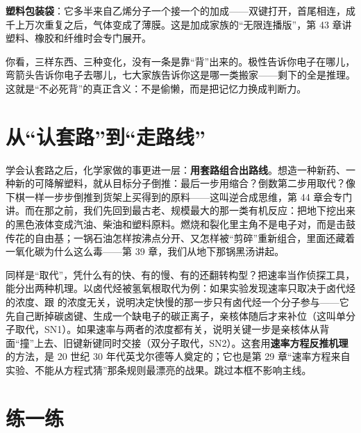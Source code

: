 \textbf{塑料包装袋}：它多半来自乙烯分子一个接一个的加成——双键打开，首尾相连，成千上万次重复之后，气体变成了薄膜。这是加成家族的“无限连播版”，第 43 章讲塑料、橡胶和纤维时会专门展开。

你看，三样东西、三种变化，没有一条是靠“背”出来的。极性告诉你电子在哪儿，弯箭头告诉你电子去哪儿，七大家族告诉你这是哪一类搬家——剩下的全是推理。这就是“不必死背”的真正含义：不是偷懒，而是把记忆力换成判断力。

\section{从“认套路”到“走路线”}

学会认套路之后，化学家做的事更进一层：\textbf{用套路组合出路线}。想造一种新药、一种新的可降解塑料，就从目标分子倒推：最后一步用缩合？倒数第二步用取代？像下棋一样一步步倒推到货架上买得到的原料——这叫逆合成思维，第 44 章会专门讲。而在那之前，我们先回到最古老、规模最大的那一类有机反应：把地下挖出来的黑色液体变成汽油、柴油和塑料原料。燃烧和裂化里主角不是电子对，而是击鼓传花的自由基；一锅石油怎样按沸点分开、又怎样被“剪碎”重新组合，里面还藏着一氧化碳为什么这么毒——第 39 章，我们从地下那锅黑汤讲起。

\begin{tiaozhan}
同样是“取代”，凭什么有的快、有的慢、有的还翻转构型？把速率当作侦探工具，能分出两种机理。以卤代烃被氢氧根取代为例：如果实验发现速率只取决于卤代烃的浓度、跟  的浓度无关，说明决定快慢的那一步只有卤代烃一个分子参与——它先自己断掉碳卤键、生成一个缺电子的碳正离子，亲核体随后才来补位（这叫单分子取代，SN1）。如果速率与两者的浓度都有关，说明关键一步是亲核体从背面“撞”上去、旧键新键同时交接（双分子取代，SN2）。这套用\textbf{速率方程反推机理}的方法，是 20 世纪 30 年代英戈尔德等人奠定的；它也是第 29 章“速率方程来自实验、不能从方程式猜”那条规则最漂亮的战果。跳过本框不影响主线。
\end{tiaozhan}

\section*{练一练}

